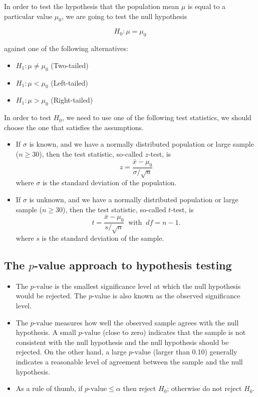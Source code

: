 \documentclass[
]{article}
\providecommand{\tightlist}{%
  \setlength{\itemsep}{0pt}\setlength{\parskip}{0pt}}
\begin{document}
In order to test the hypothesis that the population mean \(\mu\) is
equal to a particular value \(\mu_0\), we are going to test the null
hypothesis

\[H_0:\mu=\mu_0\]

against one of the following alternatives:

\begin{itemize}
\tightlist
\item
  \(H_1:\mu\neq\mu_0\) (Two-tailed)
\item
  \(H_1:\mu<\mu_0\) (Left-tailed)
\item
  \(H_1:\mu>\mu_0\) (Right-tailed)
\end{itemize}

In order to test \(H_0\), we need to use one of the following test
statistics, we should choose the one that satisfies the assumptions.

\begin{itemize}
\tightlist
\item
  If \(\sigma\) is known, and we have a normally distributed population
  or large sample (\(n\geq 30\)), then the test statistic, so-called
  \(z\)-test, is \[z=\frac{\bar{x}-\mu_0}{\sigma / \sqrt{n}}\] where
  \(\sigma\) is the standard deviation of the population.
\item
  If \(\sigma\) is unknown, and we have a normally distributed
  population or large sample (\(n \geq 30\)), then the test statistic,
  so-called \(t\)-test, is
  \[t=\frac{\bar{x}-\mu_0}{s/\sqrt{n}}\;\;\text{with}\;\; df=n-1.\]
  where \(s\) is the standard deviation of the sample.
\end{itemize}

\hypertarget{the-p-value-approach-to-hypothesis-testing}{%
\subsection{\texorpdfstring{The \(p\)-value approach to hypothesis
testing}{The p-value approach to hypothesis testing}}\label{the-p-value-approach-to-hypothesis-testing}}

\begin{itemize}
\item
  The \(p\text{-value}\) is the smallest significance level at which the
  null hypothesis would be rejected. The \(p\)-value is also known as
  the observed significance level.
\item
  The \(p\text{-value}\) measures how well the observed sample agrees
  with the null hypothesis. A small \(p\text{-value}\) (close to zero)
  indicates that the sample is not consistent with the null hypothesis
  and the null hypothesis should be rejected. On the other hand, a large
  \(p\text{-value}\) (larger than 0.10) generally indicates a reasonable
  level of agreement between the sample and the null hypothesis.
\item
  As a rule of thumb, if \(p \text{-value} \leq \alpha\) then reject
  \(H_0\); otherwise do not reject \(H_0\).
\end{itemize}
\end{document}
